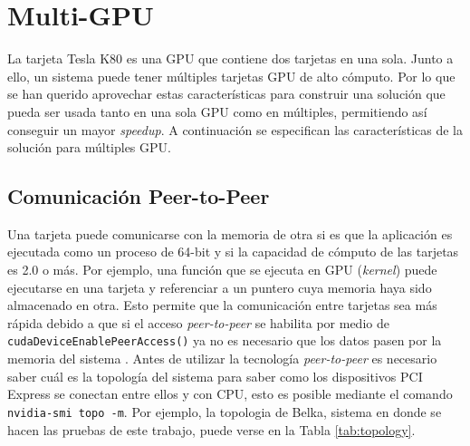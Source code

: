 \chapter{Multi-GPU}
\label{cap:multigpu}
La tarjeta Tesla K80 es una GPU que contiene dos tarjetas en una sola. Junto a ello, un sistema puede tener múltiples tarjetas GPU de alto cómputo. Por lo que se han querido aprovechar estas características para construir una solución que pueda ser usada tanto en una sola GPU como en múltiples, permitiendo así conseguir un mayor \textit{speedup}. A continuación se especifican las características de la solución para múltiples GPU.



\section{Comunicación Peer-to-Peer}
Una tarjeta puede comunicarse con la memoria de otra si es que la aplicación es ejecutada como un proceso de 64-bit y si la capacidad de cómputo de las tarjetas es 2.0 o más. Por ejemplo, una función que se ejecuta en GPU (\textit{kernel}) puede ejecutarse en una tarjeta y referenciar a un puntero cuya memoria haya sido almacenado en otra. Esto permite que la comunicación entre tarjetas sea más rápida debido a que si el acceso \textit{peer-to-peer} se habilita por medio de \texttt{cudaDeviceEnablePeerAccess()} ya no es necesario que los datos pasen por la memoria del sistema \citep{cuda}.
Antes de utilizar la tecnología \textit{peer-to-peer} es necesario saber cuál es la topología del sistema para saber como los dispositivos PCI Express se conectan entre ellos y con CPU, esto es posible mediante el comando \texttt{nvidia-smi topo -m}. Por ejemplo, la topologia de Belka, sistema en donde se hacen las pruebas de este trabajo, puede verse en la Tabla \ref{tab:topology}.

